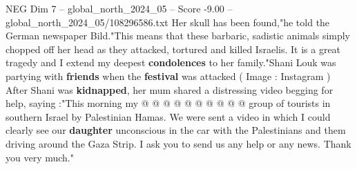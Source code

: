 \begin{textsample}{NEG Dim 7 – global\_north\_2024\_05 – Score -9.00 – global\_north\_2024\_05/108296586.txt}
Her skull has been found,"he told the German newspaper Bild."This means that these barbaric, sadistic animals simply chopped off her head as they attacked, tortured and killed Israelis.
It is a great tragedy and I extend my deepest \textbf{condolences} to her family."Shani Louk was partying with \textbf{friends} when the \textbf{festival} was attacked ( Image : Instagram ) After Shani was \textbf{kidnapped}, her mum shared a distressing video begging for help, saying :"This morning my @ @ @ @ @ @ @ @ @ @ group of tourists in southern Israel by Palestinian Hamas.
We were sent a video in which I could clearly see our \textbf{daughter} unconscious in the car with the Palestinians and them driving around the Gaza Strip.
I ask you to send us any help or any news.
Thank you very much."

\end{textsample}
